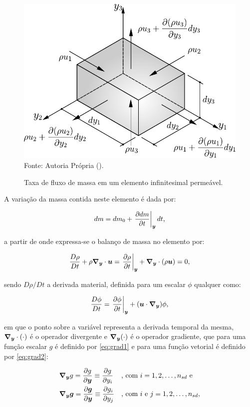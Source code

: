 \begin{figure}[h!]
    \centering
    \caption{Taxa de fluxo de massa em um elemento infinitesimal permeável.}
    \includegraphics[width=.5\linewidth]{Figuras/BalMas.pdf}
    \\Fonte: Autoria Própria (\the\year).
    \label{fig:BalMas}
\end{figure}

A variação da massa contida neste elemento é dada por:

\begin{equation}
    dm=dm_0+\left.\frac{\partial{dm}}{\partial{t}}\right|_{\boldsymbol{y}}dt\text{,}
\end{equation}

\noindent a partir de onde expressa-se o balanço de massa no elemento por:

\begin{equation}
    \frac{D\rho}{Dt}+\rho \boldsymbol{\nabla_y}\cdot\boldsymbol{u}=\left.\frac{\partial \rho}{\partial t}\right|_{\boldsymbol{y}}+\boldsymbol{\nabla_y}\cdot(\rho \boldsymbol{u})=0\text{,}
    \label{eq:BalMas}
\end{equation}

\noindent sendo $D\rho/Dt$ a derivada material, definida para um escalar $\phi$ qualquer como:

\begin{equation}
    \frac{D\phi}{Dt}=\left.\frac{\partial \phi}{\partial t}\right|_{\boldsymbol{y}}+(\boldsymbol{u}\cdot\boldsymbol{\nabla_y})\phi\text{,}
\end{equation}

\noindent em que o ponto sobre a variável representa a derivada temporal da mesma, $\boldsymbol{\nabla_y}\cdot(\cdot)$ é o operador divergente e $\boldsymbol{\nabla_y}(\cdot)$ é o operador gradiente, que para uma função escalar $g$ é definido por \eqref{eq:grad1} e para uma função vetorial é definido por \eqref{eq:grad2}:

\begin{subequations}
    \begin{align}
         & \boldsymbol{\nabla_y} g=\frac{\partial{g}}{\partial{\boldsymbol{y}}}\equiv\frac{\partial{g}}{\partial{y_i}}            &  & \text{, com }i=1,2,\hdots,n_{sd}\text{ e} \label{eq:grad1}    \\
         & \boldsymbol{\nabla_y}\boldsymbol{g}=\frac{\partial{\boldsymbol{g}}}{\partial{\boldsymbol{y}}}\equiv\frac{\partial{g_i}}{\partial{y_j}} &  & \text{, com }i\text{ e }j=1,2,\hdots,n_{sd}, \label{eq:grad2}
    \end{align}
\end{subequations}

